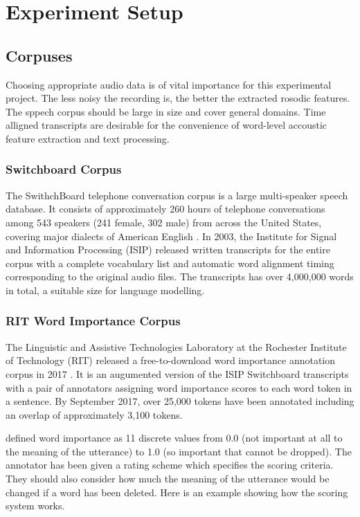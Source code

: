 \chapter{Experiment Setup}


\section{Corpuses}
Choosing appropriate audio data is of vital importance for this experimental project. The less noisy the recording is, the better the extracted rosodic features. The sppech corpus should be large in size and cover general domains. Time alligned transcripts are desirable for the convenience of word-level accoustic feature extraction and text processing. 

\subsection{Switchboard Corpus}
The SwithchBoard telephone conversation corpus is a large multi-speaker speech database. It consists of approximately 260 hours of telephone conversations among 543 speakers (241 female, 302 male) from across the United States, covering major dialects of American English\citep{Godfrey1992} . In 2003, the Institute for Signal and Information Processing (ISIP) released written transcripts for the entire corpus with a complete vocabulary list and automatic word alignment timing corresponding to the original audio files. The transcripts has over 4,000,000 words in total, a suitable size for language modelling.


\subsection{RIT Word Importance Corpus}
The Linguistic and Assistive Technologies Laboratory at the Rochester Institute of Technology (RIT) released a free-to-download word importance annotation corpus in 2017  \citep{Kafle2018}. It is an augumented version of the ISIP Switchboard transcripts with a pair of annotators assigning word importance scores to each word token in a sentence. By September 2017, over 25,000 tokens have been annotated including an overlap of approximately 3,100 tokens. 

\citet{Kafle2018} defined word importance as 11 discrete values from 0.0 (not important
at all to the meaning of the utterance) to 1.0 (so important that cannot be dropped). The annotator has been given a rating scheme which specifies the scoring criteria. They should also consider how much the meaning of the utterance would be changed if a word has been deleted. Here is an example showing how the scoring system works.

